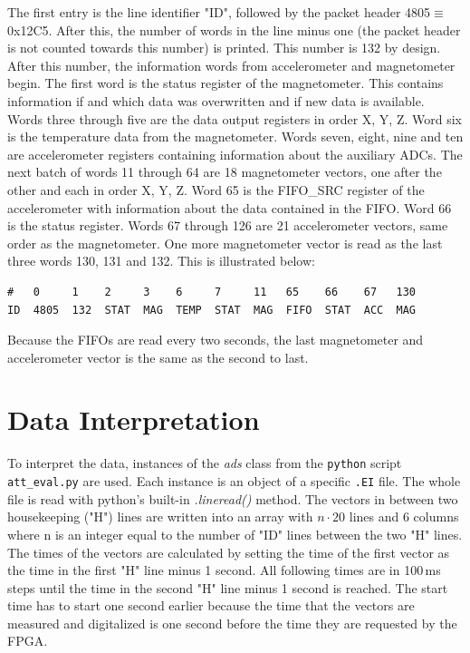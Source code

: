 The first entry is the line identifier "ID", followed by the packet header 4805$\equiv$0x12C5. After this, the number of words in the line minus one (the packet header is not counted towards this number) is printed. This number is 132 by design. After this number, the information words from accelerometer and magnetometer begin. The first word is the status register of the magnetometer. This contains information if and which data was overwritten and if new data is available. Words three through five are the data output registers in order X, Y, Z. Word six is the temperature data from the magnetometer. Words seven, eight, nine and ten are accelerometer registers containing information about the auxiliary \acp{ADC}. The next batch of words 11 through 64 are 18 magnetometer vectors, one after the other and each in order X, Y, Z. Word 65 is the FIFO\_SRC register of the accelerometer with information about the data contained in the \ac{FIFO}. Word 66 is the status register. Words 67 through 126 are 21 accelerometer vectors, same order as the magnetometer. One more magnetometer vector is read as the last three words 130, 131 and 132. This is illustrated below:
\begin{lstlisting}
#   0     1    2     3    6     7     11   65    66    67   130
ID  4805  132  STAT  MAG  TEMP  STAT  MAG  FIFO  STAT  ACC  MAG
\end{lstlisting}

Because the \acp{FIFO} are read every two seconds, the last magnetometer and accelerometer vector is the same as the second to last.

\section{Data Interpretation \label{sec:meth:data_interpretation}}
To interpret the data, instances of the \textit{ads} class from the \verb|python| script \verb|att_eval.py| are used. Each instance is an object of a specific \verb|.EI| file. The whole file is read with python's built-in \textit{.lineread()} method. The vectors in between two housekeeping ("H") lines are written into an array with $n\cdot20$ lines and 6 columns where n is an integer equal to the number of "ID" lines between the two "H" lines. The times of the vectors are calculated by setting the time of the first vector as the time in the first "H" line minus 1 second. All following times are in 100\,ms steps until the time in the second "H" line minus 1 second is reached. The start time has to start one second earlier because the time that the vectors are measured and digitalized is one second before the time they are requested by the \ac{FPGA}.

